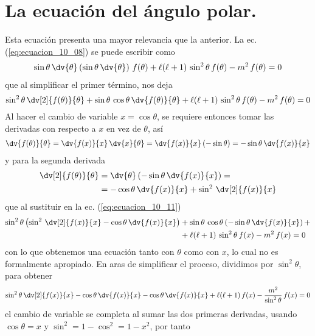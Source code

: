\section{La ecuación del ángulo polar.}
Esta ecuación presenta una mayor relevancia que la anterior. La ec. (\ref{eq:ecuacion_10_08}) se puede escribir como
\begin{align*}
\sin \theta \, \dv{\theta} \left( \sin \theta \, \dv{\theta} \right) \, f(\theta) + \ell (\ell + 1) \, \sin^{2} \theta \, f(\theta) - m^{2} \, f(\theta) = 0
\end{align*}
que al simplificar el primer término, nos deja
\begin{equation}
\sin^{2} \theta \, \dv[2]{f(\theta)}{\theta} + \sin \theta \, \cos \theta \, \dv{f(\theta)}{\theta} + \ell (\ell + 1) \, \sin^{2} \theta \, f(\theta) - m^{2} \, f(\theta) = 0
\label{eq:ecuacion_10_11}
\end{equation}
Al hacer el cambio de variable $x = \cos \theta$, se requiere entonces tomar las derivadas con respecto a $x$ en vez de $\theta$, así
\begin{align*}
\dv{f(\theta)}{\theta} = \dv{f(x)}{x} \, \dv{x}{\theta} = \dv{f(x)}{x} \, (- \sin \theta) = -\sin \theta \, \dv{f(x)}{x}
\end{align*}
y para la segunda derivada
\begin{align*}
\dv[2]{f(\theta)}{\theta} &= \dv{\theta} \left( -\sin \theta \, \dv{f(x)}{x} \right) = \\
&= - \cos \theta \, \dv{f(x)}{x} + \sin^{2} \, \dv[2]{f(x)}{x}
\end{align*}
que al sustituir en la ec. (\ref{eq:ecuacion_10_11})
\begin{align*}
\sin^{2} \theta \left( \sin^{2} \, \dv[2]{f(x)}{x} - \cos \theta \, \dv{f(x)}{x} \right) &+ \sin \theta \, \cos \theta \left( - \sin \theta \, \dv{f(x)}{x} \right) + \\
&+ \ell (\ell + 1) \, \sin^{2} \theta \, f(x) - m^{2} \, f(x) = 0
\end{align*}
con lo que obtenemos una ecuación tanto con $\theta$ como con $x$, lo cual no es formalmente apropiado. En aras de simplificar el proceso, dividimos por $\sin^{2} \theta$, para obtener
\begin{align*}
\sin^{2} \theta \, \dv[2]{f(x)}{x} - \cos \theta \, \dv{f(x)}{x} - \cos \theta \, \dv{f(x)}{x} + \ell (\ell + 1) \, f(x) - \dfrac{m^{2}}{\sin^{2} \theta} \, f(x) = 0
\end{align*}
el cambio de variable se completa al sumar las dos primeras derivadas, usando $\cos \theta = x$ y $\sin^{2} = 1 - \cos^{2} = 1 - x^{2}$, por tanto
